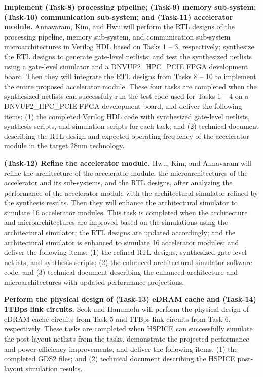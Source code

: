 \noindent
\textbf{Implement (Task-8) processing pipeline; (Task-9) memory sub-system; (Task-10) communication sub-system; and (Task-11) accelerator module.}
Annavaram, Kim, and Hwu will perform the RTL designs of the processing pipeline, memory sub-system, and communication sub-system microarchitectures in Verilog HDL based on Tasks 1 -- 3, respectively; synthesize the RTL designs to generate gate-level netlists; and test the synthesized netlists using a gate-level simulator and a DNVUF2\_HPC\_PCIE FPGA development board.  
Then they will integrate the RTL designs from Tasks 8 -- 10 to implement the entire proposed accelerator module. 
These four tasks are completed when the synthesized netlists can successfuly run the test code used for Tasks 1 -- 4 on a DNVUF2\_HPC\_PCIE FPGA development board, and deliver the following items:
(1) the completed Verilog HDL code with synthesized gate-level netlists, synthesis scripts, and simulation scripts for each task; and 
(2) technical document describing the RTL design and expected operating frequency of the accelerator module in the target 28nm technology.


\noindent
\textbf{(Task-12) Refine the accelerator module.} 
Hwu, Kim, and Annavaram will refine the architecture of the accelerator module, the microarchitectures of the accelerator and its sub-systems, and the RTL designs, after analyzing the performance of the accelerator module with the architectural simulator refined by the synthesis results.
Then they will enhance the architectural simulator to simulate 16 accelerator modules.
This task is completed when 
the architecture and microarchitectures are improved based on the simulations using the architectural simulator; 
the RTL designs are updated accordingly; and
the architectural simulator is enhanced to simulate 16 accelerator modules; and 
deliver the following items:
(1) the refined RTL designs, synthesized gate-level netlists, and synthesis scripts; 
(2) the enhanced architectural simulator software code; and
(3) technical document describing the enhanced architecture and microarchitectures with updated performance projections.


\noindent
\textbf{Perform the physical design of (Task-13) eDRAM cache and (Task-14)  1TBps link circuits.} 
Seok and Hanumolu will perform the physical design of eDRAM cache circuits from Task 5 and 1TBps link circuits from Task 6, respectively.
These tasks are completed when HSPICE can successfully simulate the post-layout netlists from the tasks, demonstrate the projected performance and power-efficiency improvements, and deliver the following items:
(1) the completed GDS2 files; and (2) technical document describing the HSPICE post-layout simulation results.


